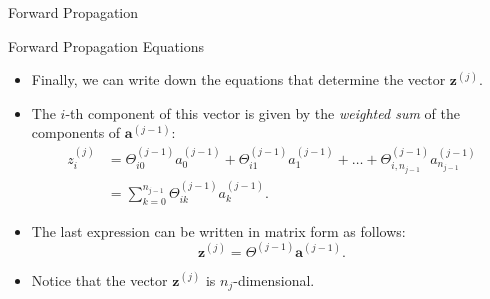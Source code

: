 \documentclass[8pt,american]{beamer}
\begin{document}
\begin{frame}{Forward Propagation}

\begin{block}{Forward Propagation Equations}
\begin{itemize}
\justifying
\item Finally, we can write down the equations that determine the vector
  $\mathbf{z}^{\left(j\right)}$.
\item The $i$-th component of this vector is given by the \textit{weighted sum}
  of the components of $\mathbf{a}^{\left(j-1\right)}$:
  \begin{align}
  \nonumber z_{i}^{\left(j\right)}&=\Theta_{i0}^{\left(j-1\right)}a_{0}^{\left(j-1\right)}+\Theta_{i1}^{\left(j-1\right)}a_{1}^{\left(j-1\right)}+\ldots+\Theta_{i,n_{j-1}}^{\left(j-1\right)}a_{n_{j-1}}^{\left(j-1\right)}\\
  &=\sum_{k=0}^{n_{j-1}}\Theta_{ik}^{\left(j-1\right)}a_{k}^{\left(j-1\right)}.
  \end{align}
\item The last expression can be written in matrix form as follows:
  \begin{equation}
  \mathbf{z}^{\left(j\right)}=\Theta^{\left(j-1\right)}\mathbf{a}^{\left(j-1\right)}.
  \end{equation}
\item Notice that the vector $\mathbf{z}^{\left(j\right)}$ is
  $n_{j}$-dimensional.
\end{itemize}
\end{block}

\end{frame}
\end{document}
